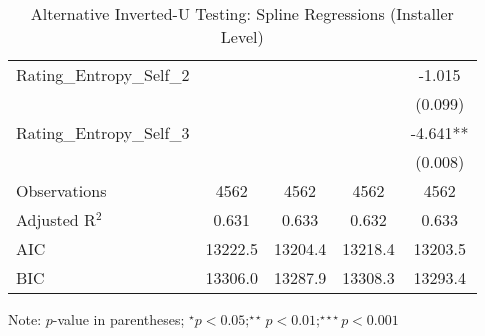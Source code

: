\begin{table}[]
\begin{threeparttable}[t]
\begin{tabular}{@{}lcccc@{}}
Rating\_Entropy\_Self\_2   &           &           &          & -1.015   \\
                           &           &           &          & (0.099)  \\
Rating\_Entropy\_Self\_3   &           &           &          & -4.641** \\
                           &           &           &          & (0.008)  \\
Observations               & 4562      & 4562      & 4562     & 4562     \\
Adjusted R$^2$                         & 0.631     & 0.633     & 0.632    & 0.633    \\
AIC                       & 13222.5   & 13204.4   & 13218.4  & 13203.5  \\
BIC                        & 13306.0   & 13287.9   & 13308.3  & 13293.4 \\ \bottomrule
\end{tabular}%
\begin{tablenotes}
\item Note: $p$-value in parentheses; $^\star p<0.05;^{\star\star} p<0.01;^{\star\star\star} p<0.001 $
\end{tablenotes}
\end{threeparttable}
\caption{Alternative Inverted-U Testing: Spline Regressions (Installer Level)}
\label{rob_spline_ind}
\end{table}